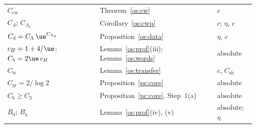 \begin{table}[htb]
\begin{tabular}{@{}lll@{}}
$C_{\mathrm{cw}}$ & Theorem~\ref{os:cw} & $c$\\
$C_\Lambda$; $C_{\Lambda_\eta}$ & Corollary~\ref{os:cwp} & $c$; $\eta$, $c$\\
$C_{\mathrm d}=C_\Lambda\,\ue^{C_{\Lambda_\eta}}$ & Proposition~\ref{os:data} & $\eta$, $c$\\
$c_H=1+4/\ue$; $C_5=2\ue\,c_H$ & Lemma~\ref{os:prof}(iii); Lemma~\ref{os:words} & absolute\\
$C_{\mathrm{tr}}$ & Lemma~\ref{os:transfer} & $c$, $C_{\mathrm{sh}}$\\
$C_{\mathrm{gr}}=2/\log2$ & Proposition~\ref{pc:core} & absolute\\
$C_6\ge C_3$ & Proposition~\ref{pc:core}, Step~1(a) & absolute\\
$B_0$; $B_\eta$ & Lemma~\ref{os:prof}(iv), (v) & absolute; $\eta$\\
\hline
\end{tabular}
\end{table}
